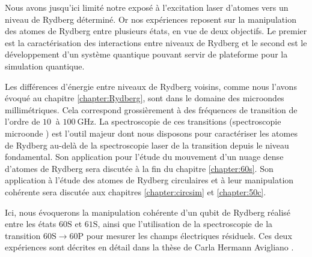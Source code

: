\noindent Nous avons jusqu'ici limité notre exposé à l'excitation laser d'atomes vers un niveau de Rydberg déterminé.
Or nos expériences reposent sur la manipulation des atomes de Rydberg entre plusieurs états, en vue de deux objectifs.
Le premier est la caractérisation des interactions entre niveaux de Rydberg et le second est le développement d'un système quantique pouvant servir de plateforme pour la simulation quantique.

Les différences d'énergie entre niveaux de Rydberg voisins, comme nous l'avons évoqué au chapitre \ref{chapter:Rydberg}, sont dans le domaine des microondes millimétriques.
Cela correspond grossièrement à des fréquences de transition de l'ordre de $\SI{10}{}$ à $\SI{100}{\GHz}$.
La spectroscopie de ces transitions (\og spectroscopie microonde \fg{}) est l'outil majeur dont nous disposons pour caractériser les atomes de Rydberg au-delà de la spectroscopie laser de la transition depuis le niveau fondamental.
Son application pour l'étude du mouvement d'un nuage dense d'atomes de Rydberg sera discutée à la fin du chapitre \ref{chapter:60s}.
Son application à l'étude des atomes de Rydberg circulaires et à leur manipulation cohérente sera discutée aux chapitres \ref{chapter:circsim} et \ref{chapter:50c}.

Ici, nous évoquerons la manipulation cohérente d'un \og qubit de Rydberg \fg{} réalisé entre les états $\mathrm{60S}$ et $\mathrm{61S}$, ainsi que l'utilisation de la spectroscopie de la transition $\mathrm{60S} \rightarrow \mathrm{60P}$ pour mesurer les champs électriques résiduels.
Ces deux expériences 
sont décrites en détail dans la thèse de Carla Hermann Avigliano \cite{PHD_HERMANN}.

